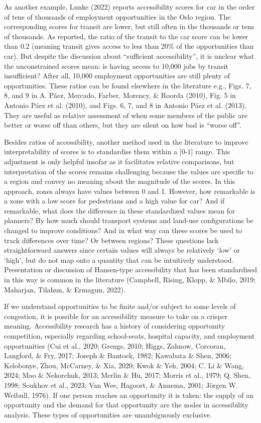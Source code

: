 \documentclass[
11pt, %
oneside, %
english, %
singlespacing, %
]{macthesis} %
\begin{document}
As another example, Lunke (2022) reports accessibility scores for car in the order of tens of thousands of employment opportunities in the Oslo region. The corresponding scores for transit are lower, but still often in the thousands or tens of thousands. As reported, the ratio of the transit to the car score can be lower than 0.2 (meaning transit gives access to less than 20\% of the opportunities than car). But despite the discussion about ``sufficient accessibility'', it is unclear what the unconstrained scores mean: is having access to 10,000 jobs by transit insufficient? After all, 10,000 employment opportunities are still plenty of opportunities. These ratios can be found elsewhere in the literature e.g., Figs. 7, 8, and 9 in A. Páez, Mercado, Farber, Morency, \& Roorda (2010), Fig. 5 in Antonio Páez et al. (2010), and Figs. 6, 7, and 8 in Antonio Páez et al. (2013). They are useful as relative assessment of when some members of the public are better or worse off than others, but they are silent on how bad is ``worse off''.

Besides ratios of accessibility, another method used in the literature to improve interpretability of scores is to standardise them within a {[}0-1{]} range. This adjustment is only helpful insofar as it facilitates relative comparisons, but interpretation of the scores remains challenging because the values are specific to a region and convey no meaning about the magnitude of the scores. In this approach, zones always have values between 0 and 1. However, how remarkable is a zone with a low score for pedestrians and a high value for car? And if remarkable, what does the difference in these standardized values mean for planners? By how much should transport systems and land-use configurations be changed to improve conditions? And in what way can these scores be used to track differences over time? Or between regions? These questions lack straightforward answers since certain values will always be relatively `low' or `high', but do not map onto a quantity that can be intuitively understood. Presentation or discussion of Hansen-type accessibility that has been standardised in this way is common in the literature (Campbell, Rising, Klopp, \& Mbilo, 2019; Maharjan, Tilahun, \& Ermagun, 2022).

If we understand opportunities to be finite and/or subject to some levels of congestion, it is possible for an accessibility measure to take on a crisper meaning. Accessibility research has a history of considering opportunity competition, especially regarding school-seats, hospital capacity, and employment opportunities (Cui et al., 2020; Grengs, 2010; Higgs, Zahnow, Corcoran, Langford, \& Fry, 2017; Joseph \& Bantock, 1982; Kawabata \& Shen, 2006; Kelobonye, Zhou, McCarney, \& Xia, 2020; Kwok \& Yeh, 2004; C. Li \& Wang, 2024; Mao \& Nekorchuk, 2013; Merlin \& Hu, 2017; Morris et al., 1979; Q. Shen, 1998; Soukhov et al., 2023; Van Wee, Hagoort, \& Annema, 2001; Jörgen W. Weibull, 1976). If one person reaches an opportunity it is taken: the supply of an opportunity and the demand for that opportunity are the nodes in accessibility analysis. These types of opportunities are unambiguously exclusive.
\end{document}

